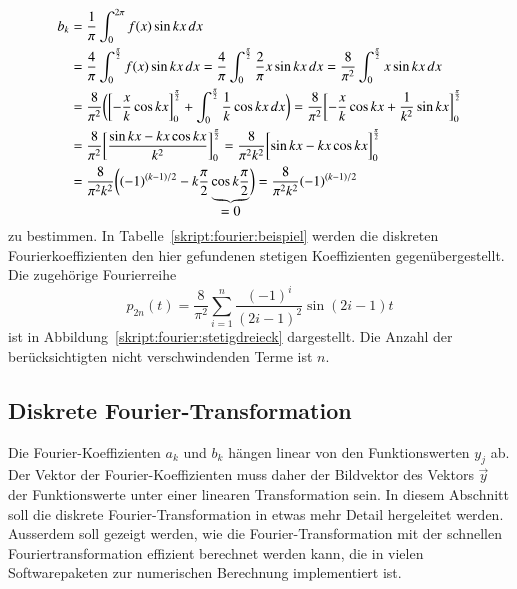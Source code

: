 \begin{align}
b_k
&=
\frac{1}{\pi} \int_0^{2\pi} f(x) \sin kx\,dx
\notag
\\
&=
\frac{4}{\pi} \int_{0}^{\frac{\pi}2} f(x)\sin kx\,dx
=
\frac{4}{\pi} \int_{0}^{\frac{\pi}2} \frac2{\pi}x\sin kx\,dx
=
\frac{8}{\pi^2} \int_{0}^{\frac{\pi}2} x\sin kx\,dx
\notag
\\
&=
\frac{8}{\pi^2} \biggl(
\biggl[-\frac{x}{k}\cos kx\biggr]_0^{\frac{\pi}2} + \int_{0}^{\frac{\pi}2}\frac{1}{k}\cos kx\,dx
\biggr)
=
\frac{8}{\pi^2}
\biggl[
-\frac{x}{k}\cos kx +\frac{1}{k^2}\sin kx
\biggr]_0^{\frac{\pi}2}
\notag
\\
&=
\frac{8}{\pi^2} \biggl[ \frac{\sin kx - kx\cos kx}{k^2}\biggr]_0^{\frac{\pi}2}
=
\frac{8}{\pi^2 k^2} \biggl[\sin kx - kx\cos kx\biggr]_0^{\frac{\pi}2}
\notag
\\
&=
\frac{8}{\pi^2k^2}\biggl(
(-1)^{(k-1)/2} - k\frac{\pi}2\underbrace{\cos k\frac{\pi}2}_{\displaystyle=0}
\biggr)
=
\frac{8}{\pi^2k^2}(-1)^{(k-1)/2}
\label{skript:fourier:bkstetig}
\end{align}
zu bestimmen.
In Tabelle~\ref{skript:fourier:beispiel} werden die diskreten
Fourierkoeffizienten den hier gefundenen stetigen Koeffizienten
gegenübergestellt.
Die zugehörige Fourierreihe
\begin{equation}
p_{2n}(t) = \frac{8}{\pi^2} \sum_{i=1}^n \frac{(-1)^i}{(2i-1)^2}\sin(2i-1)t
\label{skript:fourier:dreieckreihe}
\end{equation}
ist in Abbildung~\ref{skript:fourier:stetigdreieck} dargestellt.
Die Anzahl der berücksichtigten nicht verschwindenden Terme ist $n$.

\subsection{Diskrete Fourier-Transformation}
Die Fourier-Koeffizienten $a_k$ und $b_k$ hängen linear von den
Funktionswerten $y_j$ ab.
Der Vektor der Fourier-Koeffizienten muss daher der Bildvektor des
Vektors $\vec y$ der Funktionswerte unter einer linearen Transformation
sein.
In diesem Abschnitt soll die diskrete Fourier-Transformation in etwas
mehr Detail hergeleitet werden.
Ausserdem soll gezeigt werden, wie die Fourier-Transformation
mit der schnellen Fouriertransformation
effizient berechnet werden kann, die in vielen Softwarepaketen zur
numerischen Berechnung implementiert ist.

